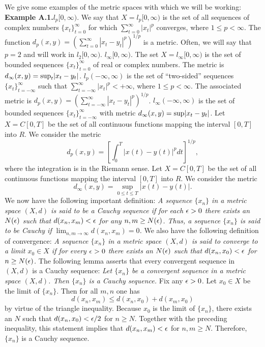 We give some examples of the metric spaces with which we will be working:
\medskip
\noindent
{\bf Example A.1.}\quad  $l_p[0,\infty)$.  We say that $X=l_p[0,\infty)$ is
the set of all sequences of complex numbers $\{x_t\}_{t=0}^\infty$ for which
$\sum_{t=0}^\infty |x_t|^p$ converges, where $1\le p<\infty$.  The function
$d_p(x,y)=(\sum_{t=0}^\infty |x_t-y_t|^p)^{1/p}$ is a metric.  Often, we will
say that $p=2$ and will work in $l_2[0,\infty)$.
\medskip
{}\quad  $l_\infty[0,\infty)$.  The set
$X=l_\infty[0,\infty)$ is the set of bounded sequences $\{x_t\}_{t=0}^\infty$
of real or complex numbers.  The metric is $d_\infty(x,y) = {\rm
sup}_t|x_t-y_t|$.
\medskip
{}\quad $l_p(-\infty,\infty)$ is the set
of ``two-sided''
sequences $\{x_t\}_{t=-\infty}^\infty$ such that $\sum_{t=-\infty}^\infty
|x_t|^p<+\infty$, where $1\le p<\infty$.  The associated metric is $d_p(x,y) =
(\sum_{t=-\infty}^\infty |x_t-y_t|^p)^{1/p}$.
\medskip
{}\quad $l_\infty(-\infty,\infty)$ is the
set of bounded
sequences $\{x_t\}_{t=-\infty}^\infty$ with metric $d_\infty(x,y)={\rm sup}
|x_t-y_t|$.
\medskip
{}\quad  Let $X=C[0,T]$ be the set of all continuous
functions mapping the interval $[0,T]$ into $R$.  We consider the metric
$$d_p(x,y) = \left[ \int_0^T |x(t) -y(t)|^p dt\right]^{1/p},$$
where the integration is in the Riemann sense.
\medskip
{}\quad  Let $X=C[0,T]$ be the set of all continuous
functions mapping the interval $[0,T]$ into $R$.  We consider the metric
$$d_\infty(x,y) =\sup\limits_{0\le t\le T} |x(t)-y(t)|.$$
\medskip
We now have the following important definition:
\medskip
{\it A sequence $\{x_n\}$ in a metric space $(X,d)$
is said to be a Cauchy sequence if for each ${\epsilon}>0$ there exists an $N({\epsilon})$
such that $d(x_n,x_m)<{\epsilon}$ for any $n,m\ge N({\epsilon})$.  Thus, a sequence
$\{x_n\}$ is said to be Cauchy if $\lim_{n,m\to\infty} d(x_n,x_m)=0$.}
\enddefinition
\medskip
We also have the following definition of convergence:
\medskip
{\it A sequence $\{x_n\}$ in a metric space $(X,d)$
is said to converge to a limit $x_0\in X$ if for every ${\epsilon}>0$ there exists an
$N({\epsilon})$ such that $d(x_n,x_0)<{\epsilon}$ for $n\ge N({\epsilon})$.}
\enddefinition
\medskip
The following lemma asserts that every convergent sequence in $(X,d)$ is a
Cauchy sequence:
\medskip
{}  {\it Let $\{x_n\}$ be a convergent sequence in a metric
space $(X,d)$. Then $\{x_n\}$ is a Cauchy sequence.}\endlemma
\medskip
\proof Fix any ${\epsilon}>0$.  Let $x_0 \in X$
 be the limit of $\{x_n\}$.  Then for
all $m,n$ one has
$$d(x_n,x_m)\le d(x_n,x_0)+d(x_m,x_0)$$
by virtue of the triangle inequality.  Because $x_0$ is the limit of $\{x_n\}$,
there exists an $N$ such that $d(x_n,x_0)<{\epsilon}/2$ for $n\ge N$.  Together with
the preceding inequality, this statement implies that $d(x_n,x_m)<{\epsilon}$
 for $n,m\ge N$.  Therefore, $\{x_n\}$ is a Cauchy sequence.  \endproof %
\medskip

